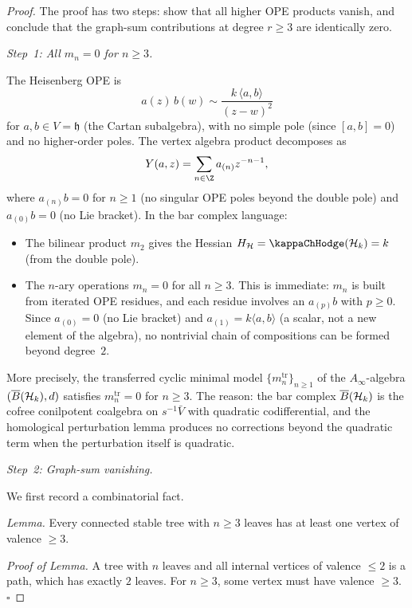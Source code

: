 \begin{proof}
The proof has two steps: show that all higher OPE products
vanish, and conclude that the graph-sum contributions
at degree $r \geq 3$ are identically zero.

\medskip
\emph{Step~1: All $m_n = 0$ for $n \geq 3$.}

The Heisenberg OPE is
\begin{equation}%
a(z)\,b(w) \sim \frac{k\,\langle a, b \rangle}{(z-w)^2}
\end{equation}
for $a, b \in V = \mathfrak{h}$ (the Cartan subalgebra),
with no simple pole (since $[a,b] = 0$) and no
higher-order poles. The vertex algebra product decomposes
as
\[
Y(a, z) = \sum_{n \in \Z} a_{(n)} z^{-n-1},
\]
where $a_{(n)}b = 0$ for $n \geq 1$ (no singular OPE
poles beyond the double pole) and $a_{(0)}b = 0$
(no Lie bracket). In the bar complex language:
\begin{itemize}
\item The bilinear product $m_2$ gives the Hessian
 $H_{\mathcal{H}} = \kappaChHodge(\mathcal{H}_k) = k$ (from the double pole).
\item The $n$-ary operations $m_n = 0$ for all $n \geq 3$.
 This is immediate: $m_n$ is built from
 iterated OPE residues, and each residue involves an
 $a_{(p)}b$ with $p \geq 0$. Since $a_{(0)} = 0$
 (no Lie bracket) and $a_{(1)} = k\langle a, b\rangle$
 (a scalar, not a new element of the algebra), no
 nontrivial chain of compositions can be formed beyond
 degree~$2$.
\end{itemize}

More precisely, the transferred cyclic minimal model
$\{m_n^{\mathrm{tr}}\}_{n \geq 1}$ of the
$A_\infty$-algebra $(\overline{B}(\mathcal{H}_k), d)$ satisfies
$m_n^{\mathrm{tr}} = 0$ for $n \geq 3$. The reason: the
bar complex $\overline{B}(\mathcal{H}_k)$ is the cofree
conilpotent coalgebra on $s^{-1}\bar{V}$ with quadratic
codifferential, and the homological perturbation lemma
produces no corrections beyond the quadratic term when the
perturbation itself is quadratic.

\medskip
\emph{Step~2: Graph-sum vanishing.}

We first record a combinatorial fact.

\emph{Lemma.} Every connected stable tree with
$n \geq 3$ leaves has at least one vertex of
valence $\geq 3$.

\emph{Proof of Lemma.} A tree with $n$ leaves and all
internal vertices of valence $\leq 2$ is a path, which
has exactly $2$ leaves. For $n \geq 3$, some vertex
must have valence $\geq 3$. \hfill$\square$


\end{proof}

